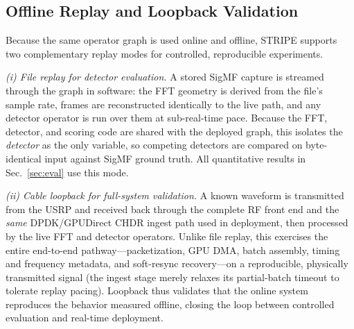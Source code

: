 
\subsection{Offline Replay and Loopback Validation}
\label{sec:replay}

Because the same operator graph is used online and offline, STRIPE supports two
complementary replay modes for controlled, reproducible experiments.

\emph{(i) File replay for detector evaluation.} A stored SigMF capture is streamed
through the graph in software: the FFT geometry is derived from the file's sample
rate, frames are reconstructed identically to the live path, and any detector
operator is run over them at sub-real-time pace. Because the FFT, detector, and
scoring code are shared with the deployed graph, this isolates the \emph{detector}
as the only variable, so competing detectors are compared on byte-identical input
against SigMF ground truth. All quantitative results in Sec.~\ref{sec:eval} use this
mode.

\emph{(ii) Cable loopback for full-system validation.} A known waveform is
transmitted from the USRP and received back through the complete RF front end and
the \emph{same} DPDK/GPUDirect CHDR ingest path used in deployment, then processed
by the live FFT and detector operators. Unlike file replay, this exercises the
entire end-to-end pathway---packetization, GPU DMA, batch assembly, timing and
frequency metadata, and soft-resync recovery---on a reproducible, physically
transmitted signal (the ingest stage merely relaxes its partial-batch timeout to
tolerate replay pacing). Loopback thus validates that the online system reproduces
the behavior measured offline, closing the loop between controlled evaluation and
real-time deployment.



